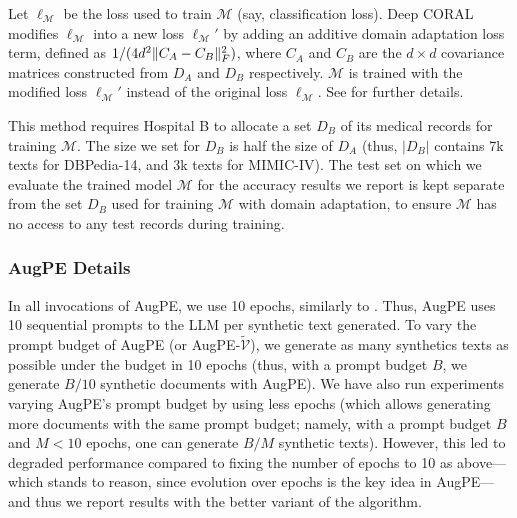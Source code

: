 Let $\ell_{\mathcal M}$ be the loss used to train $\mathcal{M}$ (say, classification loss). Deep CORAL modifies $\ell_{\mathcal M}$ into a new loss $\ell_{\mathcal M}'$ by adding an additive domain adaptation loss term, defined as $1/(4d^2\lVert C_A-C_B\rVert_F^2)$, where $C_A$ and $C_B$ are the $d\times d$ covariance matrices constructed from $D_A$ and $D_B$ respectively. $\mathcal{M}$ is trained with the modified loss $\ell_{\mathcal M}'$ instead of the original loss $\ell_{\mathcal M}$. See \cite{sun2016deep} for further details.

This method requires Hospital B to allocate a set $D_B$ of its medical records for training  $\mathcal{M}$. The size we set for $D_B$ is half the size of $D_A$ (thus, $|D_B|$ contains 7k texts for DBPedia-14, and 3k texts for MIMIC-IV). The test set on which we evaluate the trained model $\mathcal{M}$ for the accuracy results we report is kept separate from the set $D_B$ used for training $\mathcal{M}$ with domain adaptation, to ensure $\mathcal{M}$ has no access to any test records during training. 


\subsubsection{AugPE Details}\label{sec:augpe_details}
In all invocations of AugPE, we use 10 epochs, similarly to \cite{api2}. Thus, AugPE uses 10 sequential prompts to the LLM per synthetic text generated. To vary the prompt budget of AugPE (or AugPE-$\widetilde{\mathcal{V}}$), we generate as many synthetics texts as possible under the budget in 10 epochs (thus, with a prompt budget $B$, we generate $B/10$ synthetic documents with AugPE). 
We have also run experiments varying AugPE's prompt budget by using less epochs (which allows generating more documents with the same prompt budget; namely, with a prompt budget $B$ and $M<10$ epochs, one can generate $B/M$ synthetic texts). However, this led to degraded performance compared to fixing the number of epochs to 10 as above---which stands to reason, since evolution over epochs is the key idea in AugPE---and thus we report results with the better variant of the algorithm.



